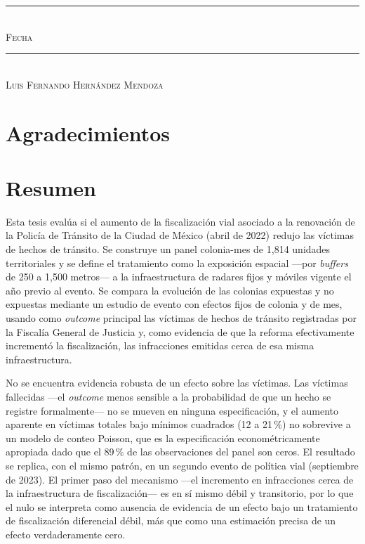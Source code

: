 \documentclass[11pt, oneside]{book}
\begin{document}
\centering
\vspace{5em}
\rule[1em]{20em}{0.5pt}\\ \textsc{Fecha}
\vspace{8em}
\rule[1em]{20em}{0.5pt}\\ \textsc{Luis Fernando Hernández Mendoza}
\endgroup
\vspace*{\fill}

\pagestyle{plain}
\frontmatter

\chapter*{Agradecimientos}

\chapter*{Resumen}
\noindent
Esta tesis evalúa si el aumento de la fiscalización vial asociado a la
renovación de la Policía de Tránsito de la Ciudad de México (abril de 2022)
redujo las víctimas de hechos de tránsito. Se construye un panel colonia-mes
de 1{,}814 unidades territoriales y se define el tratamiento como la
exposición espacial —por \emph{buffers} de 250 a 1{,}500 metros— a la
infraestructura de radares fijos y móviles vigente el año previo al evento.
Se compara la evolución de las colonias expuestas y no expuestas mediante un
estudio de evento con efectos fijos de colonia y de mes, usando como
\emph{outcome} principal las víctimas de hechos de tránsito registradas por
la Fiscalía General de Justicia y, como evidencia de que la reforma
efectivamente incrementó la fiscalización, las infracciones emitidas cerca de
esa misma infraestructura.

No se encuentra evidencia robusta de un efecto sobre las víctimas. Las
víctimas fallecidas —el \emph{outcome} menos sensible a la probabilidad de
que un hecho se registre formalmente— no se mueven en ninguna
especificación, y el aumento aparente en víctimas totales bajo mínimos
cuadrados (12 a 21\,\%) no sobrevive a un modelo de conteo Poisson, que es la
especificación econométricamente apropiada dado que el 89\,\% de las
observaciones del panel son ceros. El resultado se replica, con el mismo
patrón, en un segundo evento de política vial (septiembre de 2023). El
primer paso del mecanismo —el incremento en infracciones cerca de la
infraestructura de fiscalización— es en sí mismo débil y transitorio, por lo
que el nulo se interpreta como ausencia de evidencia de un efecto bajo un
tratamiento de fiscalización diferencial débil, más que como una estimación
precisa de un efecto verdaderamente cero.
\end{document}
